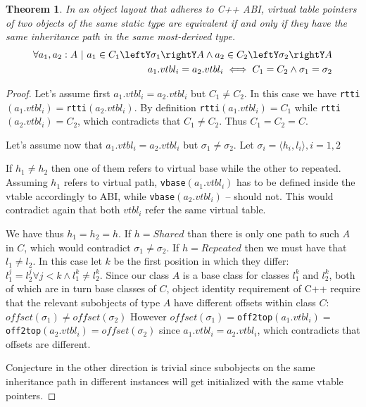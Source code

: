 \documentclass[preprint]{sigplanconf}
\makeatletter
\DeclareRobustCommand{\code}[1]{{\lstinline[breaklines=false,escapechar=@]{#1}}}
\newtheorem{theorem}{Theorem}
\makeatother
\begin{document}
\begin{theorem}
In an object layout that adheres to C++ ABI, virtual table pointers of two 
objects of the same static type are equivalent if and only if they have the same 
inheritance path in the same most-derived type.
\begin{eqnarray*}
    \forall a_1, a_2 : A\ |\ a_1\in C_1\leftY\sigma_1\rightY A \wedge a_2\in C_2\leftY\sigma_2\rightY A \\
    a_1.vtbl_i = a_2.vtbl_i \iff C_1 = C_2 \wedge \sigma_1 = \sigma_2
\end{eqnarray*}
\label{thm:vtbl}
\end{theorem}
\begin{proof}
Let's assume first $a_1.vtbl_i = a_2.vtbl_i$ but $C_1 \neq C_2$. In this case we 
have \code{rtti}$(a_1.vtbl_i) = $\code{rtti}$(a_2.vtbl_i)$. By definition 
\code{rtti}$(a_1.vtbl_i) = C_1$ while \code{rtti}$(a_2.vtbl_i) = C_2$, which 
contradicts that $C_1 \neq C_2$. Thus $C_1 = C_2 = C$.

Let's assume now that $a_1.vtbl_i = a_2.vtbl_i$ but $\sigma_1 \neq \sigma_2$. 
Let $\sigma_i=\langle h_i,l_i\rangle,i=1,2$ 

If $h_1 \neq h_2$ then one of them refers to virtual base while the other to 
repeated. Assuming $h_1$ refers to virtual path, \code{vbase}$(a_1.vtbl_i)$ has 
to be defined inside the vtable accordingly to ABI, while 
\code{vbase}$(a_2.vtbl_i)$ -- should not. This would contradict again that both 
$vtbl_i$ refer the same virtual table.

We have thus $h_1 = h_2 = h$. If $h = Shared$ than there is only one path to 
such $A$ in $C$, which would contradict $\sigma_1 \neq \sigma_2$. 
If $h = Repeated$ then we must have that $l_1 \neq l_2$. In this case let $k$ be 
the first position in which they differ: 
$l_1^j=l_2^j \forall j<k \wedge l_1^k\neq l_2^k$. Since our class $A$ is a base 
class for classes $l_1^k$ and $l_2^k$, both of which are in turn base classes of 
$C$, object identity requirement of C++ require that the relevant subobjects of 
type $A$ have different offsets within class $C$: 
$offset(\sigma_1)\neq offset(\sigma_2)$ However 
$offset(\sigma_1)=$\code{off2top}$(a_1.vtbl_i)=$\code{off2top}$(a_2.vtbl_i)=offset(\sigma_2)$ 
since $a_1.vtbl_i = a_2.vtbl_i$, which contradicts that offsets are different.

Conjecture in the other direction is trivial since subobjects on the same 
inheritance path in different instances will get initialized with the same 
vtable pointers.
\end{proof}
\end{document}
